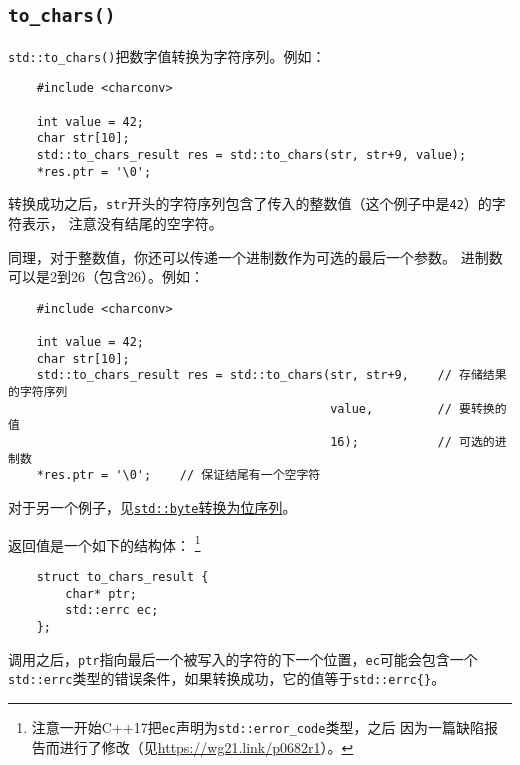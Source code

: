 \subsection{\texttt{to\_chars()}}\label{ch31.2.2}
\texttt{std::to\_chars()}把数字值转换为字符序列。例如：
\begin{lstlisting}
    #include <charconv>

    int value = 42;
    char str[10];
    std::to_chars_result res = std::to_chars(str, str+9, value);
    *res.ptr = '\0';
\end{lstlisting}
转换成功之后，\texttt{str}开头的字符序列包含了传入的整数值（这个例子中是\texttt{42}）的字符表示，
注意没有结尾的空字符。

同理，对于整数值，你还可以传递一个进制数作为可选的最后一个参数。
进制数可以是2到26（包含26）。例如：
\begin{lstlisting}
    #include <charconv>

    int value = 42;
    char str[10];
    std::to_chars_result res = std::to_chars(str, str+9,    // 存储结果的字符序列
                                             value,         // 要转换的值
                                             16);           // 可选的进制数
    *res.ptr = '\0';    // 保证结尾有一个空字符
\end{lstlisting}
对于另一个例子，见\hyperref[byte到位序列]{\texttt{std::byte}转换为位序列}。

返回值是一个如下的结构体：
\footnote{注意一开始C++17把\texttt{ec}声明为\texttt{std::error\_code}类型，之后
因为一篇缺陷报告而进行了修改（见\url{https://wg21.link/p0682r1}）。}
\begin{lstlisting}
    struct to_chars_result {
        char* ptr;
        std::errc ec;
    };
\end{lstlisting}
调用之后，\texttt{ptr}指向最后一个被写入的字符的下一个位置，\texttt{ec}可能会包含一个
\texttt{std::errc}类型的错误条件，如果转换成功，它的值等于\texttt{std::errc\{\}}。

